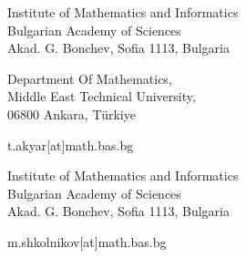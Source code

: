 \documentclass[pdflatex,sn-mathphys-num]{sn-jnl}%
\theoremstyle{thmstyleone}%
\theoremstyle{thmstyletwo}%
\theoremstyle{thmstylethree}%
\begin{document}
{\centering
Institute of Mathematics and Informatics\\
Bulgarian Academy of Sciences\\
Akad. G. Bonchev, Sofia 1113, Bulgaria \\\vspace{5pt} 

Department Of Mathematics, \\Middle East Technical University, \\06800 Ankara, Türkiye\\\vspace{5pt}

t.akyar[at]math.bas.bg\\\vspace{5pt}

Institute of Mathematics and Informatics\\
Bulgarian Academy of Sciences\\
Akad. G. Bonchev, Sofia 1113, Bulgaria \\\vspace{5pt}

m.shkolnikov[at]math.bas.bg\\ 
}
\end{document}
